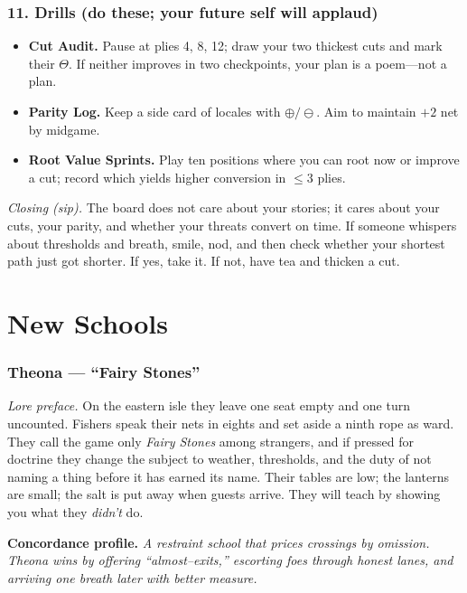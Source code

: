 \documentclass[11pt]{article}
\numberwithin{equation}{section} %
\theoremstyle{plain} %
\theoremstyle{definition} %
\theoremstyle{remark} %
\begin{document}
\subsubsection{11. Drills (do these; your future self will applaud)}
\begin{itemize}\setlength\itemsep{0.25em}
  \item \textbf{Cut Audit.} Pause at plies 4, 8, 12; draw your two thickest cuts and mark their \(\Theta\). If neither improves in two checkpoints, your plan is a poem—not a plan.
  \item \textbf{Parity Log.} Keep a side card of locales with \(\oplus/\ominus\). Aim to maintain \(+\!2\) net by midgame.
  \item \textbf{Root Value Sprints.} Play ten positions where you can root now or improve a cut; record which yields higher conversion in \(\le 3\) plies.
\end{itemize}

\medskip
\noindent\textit{Closing (sip).} The board does not care about your stories; it cares about your cuts, your parity, and whether your threats convert on time. If someone whispers about thresholds and breath, smile, nod, and then check whether your shortest path just got shorter. If yes, take it. If not, have tea and thicken a cut.

\clearpage
\section{New Schools}
\label{app:schools}

\subsubsection{Theona — “Fairy Stones”}
\label{school:theona}
{}

\noindent\textit{Lore preface.} On the eastern isle they leave one seat empty and one turn uncounted. Fishers speak their nets in eights and set aside a ninth rope as ward. They call the game only \emph{Fairy Stones} among strangers, and if pressed for doctrine they change the subject to weather, thresholds, and the duty of not naming a thing before it has earned its name. Their tables are low; the lanterns are small; the salt is put away when guests arrive. They will teach by showing you what they \emph{didn’t} do.

\medskip
\noindent\textbf{Concordance profile.} \emph{A restraint school that prices crossings by omission. Theona wins by offering “almost–exits,” escorting foes through honest lanes, and arriving one breath later with better measure.}
\end{document}
